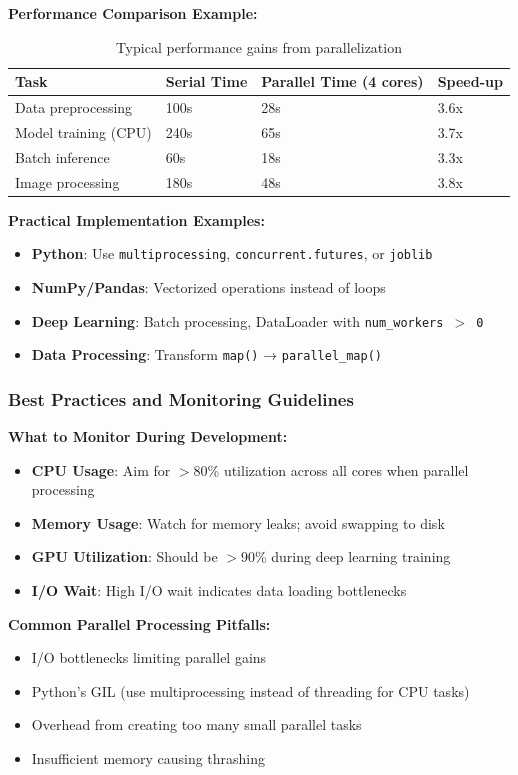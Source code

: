 \documentclass[11pt,a4paper]{article}
\newcommand{\warningitem}{\item[\color{orange}\faExclamationTriangle]}
\begin{document}
\textbf{Performance Comparison Example:}
\begin{table}[H]
\centering
\begin{tabular}{@{}llll@{}}
\toprule
\textbf{Task} & \textbf{Serial Time} & \textbf{Parallel Time (4 cores)} & \textbf{Speed-up} \\
\midrule
Data preprocessing & 100s & 28s & 3.6x \\
Model training (CPU) & 240s & 65s & 3.7x \\
Batch inference & 60s & 18s & 3.3x \\
Image processing & 180s & 48s & 3.8x \\
\bottomrule
\end{tabular}
\caption{Typical performance gains from parallelization}
\end{table}

\textbf{Practical Implementation Examples:}
\begin{itemize}
    \item \textbf{Python}: Use \texttt{multiprocessing}, \texttt{concurrent.futures}, or \texttt{joblib}
    \item \textbf{NumPy/Pandas}: Vectorized operations instead of loops
    \item \textbf{Deep Learning}: Batch processing, DataLoader with \texttt{num\_workers $>$ 0}
    \item \textbf{Data Processing}: Transform \texttt{map()} → \texttt{parallel\_map()}
\end{itemize}

\subsubsection{Best Practices and Monitoring Guidelines}

\textbf{What to Monitor During Development:}
\begin{itemize}
    \item \textbf{CPU Usage}: Aim for $>$80\% utilization across all cores when parallel processing
    \item \textbf{Memory Usage}: Watch for memory leaks; avoid swapping to disk
    \item \textbf{GPU Utilization}: Should be $>$90\% during deep learning training
    \item \textbf{I/O Wait}: High I/O wait indicates data loading bottlenecks
\end{itemize}

\textbf{Common Parallel Processing Pitfalls:}
\begin{itemize}
    \warningitem I/O bottlenecks limiting parallel gains
    \warningitem Python's GIL (use multiprocessing instead of threading for CPU tasks)
    \warningitem Overhead from creating too many small parallel tasks
    \warningitem Insufficient memory causing thrashing
\end{itemize}
\end{document}
